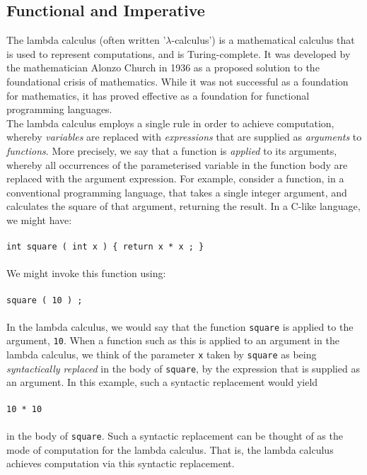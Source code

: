 \documentclass{article}
\begin{document}
\subsection{Functional and Imperative}
The lambda calculus (often written '$\lambda$-calculus') is a mathematical calculus that is used to represent computations, and is Turing-complete. It was developed by the mathematician Alonzo Church in 1936 as a proposed solution to the foundational crisis of mathematics. While it was not successful as a foundation for mathematics, it has proved effective as a foundation for functional programming languages.
\\
\indent The lambda calculus employs a single rule in order to achieve computation, whereby \emph{variables} are replaced with \emph{expressions} that are supplied as \emph{arguments} to \emph{functions}. More precisely, we say that a function is \emph{applied} to its arguments, whereby all occurrences of the parameterised variable in the function body are replaced with the argument expression. For example, consider a function, in a conventional programming language, that takes a single integer argument, and calculates the square of that argument, returning the result. In a C-like language, we might have:
\\\\
\indent \texttt{int square ( int x ) \{ return x * x ; \}}
\\\\
We might invoke this function using:
\\\\
\indent \texttt{square ( 10 ) ;}
\\\\
In the lambda calculus, we would say that the function \texttt{square} is applied to the argument, \texttt{10}. When a function such as this is applied to an argument in the lambda calculus, we think of the parameter \texttt{x} taken by \texttt{square} as being \emph{syntactically replaced} in the body of \texttt{square}, by the expression that is supplied as an argument. In this example, such a syntactic replacement would yield
\\\\
\indent \texttt{10 * 10}
\\\\
in the body of \texttt{square}. Such a syntactic replacement can be thought of as the mode of computation for the lambda calculus. That is, the lambda calculus achieves computation via this syntactic replacement.
\\
\end{document}
